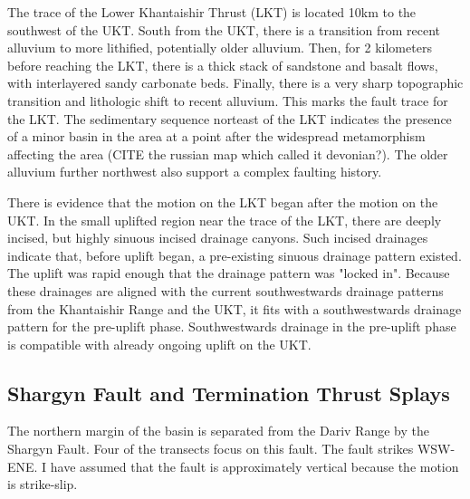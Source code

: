 The trace of the Lower Khantaishir Thrust (LKT) is located 10km to the southwest of the UKT. South from the UKT, there is a transition from recent alluvium to more lithified, potentially older alluvium. Then, for 2 kilometers before reaching the LKT, there is a thick stack of sandstone and basalt flows, with interlayered sandy carbonate beds. Finally, there is a very sharp topographic transition and lithologic shift to recent alluvium. This marks the fault trace for the LKT. The sedimentary sequence norteast of the LKT indicates the presence of a minor basin in the area at a point after the widespread metamorphism affecting the area (CITE the russian map which called it devonian?). The older alluvium further northwest also support a complex faulting history.

There is evidence that the motion on the LKT began after the motion on the UKT. In the small uplifted region near the trace of the LKT, there are deeply incised, but highly sinuous incised drainage canyons. Such incised drainages indicate that, before uplift began, a pre-existing sinuous drainage pattern existed. The uplift was rapid enough that the drainage pattern was "locked in". Because these drainages are aligned with the current southwestwards drainage patterns from the Khantaishir Range and the UKT, it fits with a southwestwards drainage pattern for the pre-uplift phase. Southwestwards drainage in the pre-uplift phase is compatible with already ongoing uplift on the UKT.

\subsection{Shargyn Fault and Termination Thrust Splays}

The northern margin of the basin is separated from the Dariv Range by the Shargyn Fault. Four of the transects focus on this fault. The fault strikes WSW-ENE. I have assumed that the fault is approximately vertical because the motion is strike-slip. 

